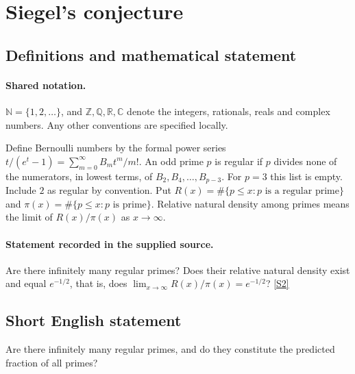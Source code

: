 \documentclass[11pt]{article}
\newcommand{\sref}[2]{\hyperlink{source:#1:#2}{[S#2]}}
\begin{document}
\section{Siegel's conjecture}\label{statement}

\subsection{Definitions and mathematical statement}

\paragraph{Shared notation.}$\mathbb N=\{1,2,\ldots\}$, and $\mathbb Z,\mathbb Q,\mathbb R,\mathbb C$ denote the integers, rationals, reals and complex numbers. Any other conventions are specified locally.


Define Bernoulli numbers by the formal power series $t/(e^t-1)=\sum_{m=0}^{\infty}B_mt^m/m!$. An odd prime $p$ is regular if $p$ divides none of the numerators, in lowest terms, of $B_2,B_4,\ldots,B_{p-3}$. For $p=3$ this list is empty. Include $2$ as regular by convention. Put $R(x)=\#\{p\le x:p\text{ is a regular prime}\}$ and $\pi(x)=\#\{p\le x:p\text{ is prime}\}$. Relative natural density among primes means the limit of $R(x)/\pi(x)$ as $x\to\infty$.
\paragraph{Statement recorded in the supplied source.}
Are there infinitely many regular primes? Does their relative natural density exist and equal $e^{-1/2}$, that is, does $\lim_{x\to\infty}R(x)/\pi(x)=e^{-1/2}$? \sref{statement}{2}
\subsection{Short English statement}
Are there infinitely many regular primes, and do they constitute the predicted fraction of all primes?
\end{document}
